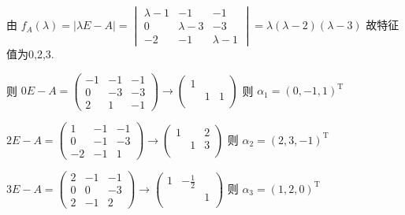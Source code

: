\begin{enumerate}
                   由 \( f_{A}(\lambda) = |\lambda E - A| = \begin{vmatrix}
                       \lambda-1 & -1        & -1        \\
                       0         & \lambda-3 & -3        \\
                       -2        & -1        & \lambda-1
                   \end{vmatrix} = \lambda(\lambda-2)(\lambda-3) \) 故特征值为0,2,3.

                   则 \( 0E-A = \begin{pmatrix}
                       -1 & -1 & -1 \\
                       0  & -3 & -3 \\
                       2  & 1  & -1
                   \end{pmatrix} \rightarrow \begin{pmatrix}
                       1 &   &   \\
                         & 1 & 1 \\
                         &   &
                   \end{pmatrix} \) 则 \( \alpha_{1} = (0, -1, 1)^{\mathrm{T}} \)

                   \( 2E-A = \begin{pmatrix}
                       1  & -1 & -1 \\
                       0  & -1 & -3 \\
                       -2 & -1 & 1
                   \end{pmatrix} \rightarrow \begin{pmatrix}
                       1 &   & 2 \\
                         & 1 & 3 \\
                         &   &
                   \end{pmatrix} \) 则 \( \alpha_{2} = (2, 3, -1)^{\mathrm{T}} \)

                   \( 3E-A = \begin{pmatrix}
                       2 & -1 & -1 \\
                       0 & 0  & -3 \\
                       2 & -1 & 2
                   \end{pmatrix} \rightarrow \begin{pmatrix}
                       1 & -\frac{1}{2} &   \\
                         &              & 1 \\
                         &              &
                   \end{pmatrix} \) 则 \( \alpha_{3} = (1, 2, 0)^{\mathrm{T}} \)


\end{enumerate}
